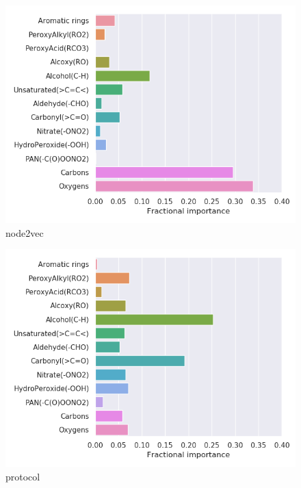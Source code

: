 \begin{subfigure}[b]{0.46\textwidth}
    \centering
    \includegraphics[width=\textwidth]{outputs/PCA/node2vec/legend.png}
    \caption{node2vec}
    \label{fig:legend_PCA_node2vec}
\end{subfigure}
\begin{subfigure}[b]{0.46\textwidth}
    \centering
    \includegraphics[width=\textwidth]{outputs/PCA/protocol/legend.png}
    \caption{protocol}
    \label{fig:legend_PCA_protocol}
\end{subfigure}\\
